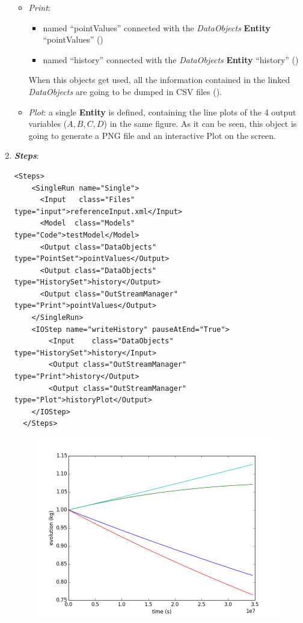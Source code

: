 \begin{enumerate}
  \begin{itemize}
    \item \textit{Print}: 
     \begin{itemize}
       \item named ``pointValues'' connected with the \textit{DataObjects} \textbf{Entity} ``pointValues'' 
                ()
       \item named ``history'' connected with the \textit{DataObjects} \textbf{Entity} ``history'' ()          
     \end{itemize}         
      When this objects get used, all the information contained in the linked  \textit{DataObjects} are going 
    to be dumped in CSV files ().
    \item \textit{Plot}: a single  \textbf{Entity} is defined, containing the line plots of the 4 output variables 
    ($A,B,C,D$) in the same figure. As it can be seen, this object is going to generate a PNG file and an interactive Plot on 
    the screen.
  \end{itemize}   
   \item \textbf{\textit{Steps}}:   
\begin{lstlisting}[style=XML,morekeywords={arg,extension,pauseAtEnd,overwrite}]
  <Steps>
    <SingleRun name="Single">
      <Input   class="Files"                        type="input">referenceInput.xml</Input>
      <Model  class="Models"                    type="Code">testModel</Model>
      <Output class="DataObjects"            type="PointSet">pointValues</Output>
      <Output class="DataObjects"            type="HistorySet">history</Output>
      <Output class="OutStreamManager" type="Print">pointValues</Output>
    </SingleRun>
    <IOStep name="writeHistory" pauseAtEnd="True">
        <Input    class="DataObjects"            type="HistorySet">history</Input>
        <Output class="OutStreamManager" type="Print">history</Output>
        <Output class="OutStreamManager" type="Plot">historyPlot</Output>
    </IOStep>
  </Steps>
\end{lstlisting}
 \begin{figure}[h!]
  \centering
  \includegraphics[scale=0.7]{pics/1-historyPlot_line-line-line-line.png}

\end{figure}
\end{enumerate}
